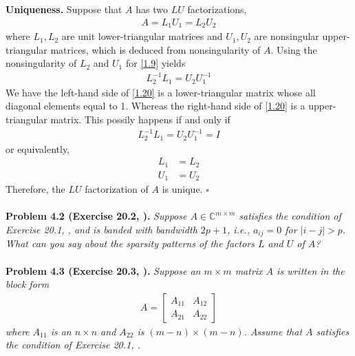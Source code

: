 \documentclass[a4paper,oneside]{book}
\numberwithin{equation}{chapter}
\begin{document}
\textbf{Uniqueness.} Suppose that $A$ has two $LU$ factorizations, 
\begin{align}
\label{1.19}
A = {L_1}{U_1} = {L_2}{U_2}
\end{align}
where $L_1,L_2$ are unit lower-triangular matrices and $U_1, U_2$ are nonsingular upper-triangular matrices, which is deduced from nonsingularity of $A$. Using the nonsingularity of $L_2$ and $U_1$ for \eqref{1.9} yields
\begin{align}
\label{1.20}
L_2^{ - 1}{L_1} = {U_2}U_1^{ - 1}
\end{align}
We have the left-hand side of \eqref{1.20} is a lower-triangular matrix whose all diagonal elements equal to 1. Whereas the right-hand side of \eqref{1.20} is a upper-triangular matrix. This possily happens if and only if
\begin{align}
L_2^{ - 1}{L_1} = {U_2}U_1^{ - 1} = I
\end{align}
or equivalently,
\begin{align}
{L_1}& = {L_2}\\
{U_1} &= {U_2}
\end{align}
Therefore, the $LU$ factorization of $A$ is unique. \hfill $\square$\\
\\
\textbf{Problem 4.2 (Exercise 20.2, \cite{1}).} \textit{Suppose $A\in \mathbb{C}^{m\times m}$ satisfies the condition of Exercise 20.1, \cite{1}, and is banded with bandwidth $2p+1$, i.e., $a_{ij}=0$ for $\left|i-j\right|>p$. What can you say about the sparsity patterns of the factors $L$ and $U$ of $A$?}\\
\\
\textbf{Problem 4.3 (Exercise 20.3, \cite{1}).} \textit{Suppose an $m\times m$ matrix $A$ is written in the block form}
\begin{align}
A = \left[ {\begin{array}{*{20}{c}}
{{A_{11}}}&{{A_{12}}}\\
{{A_{21}}}&{{A_{22}}}
\end{array}} \right]
\end{align}
\textit{where $A_{11}$ is an $n\times n$ and $A_{22}$ is $\left(m-n\right)\times \left(m-n\right)$. Assume that $A$ satisfies the condition of Exercise 20.1, \cite{1}.}
\end{document}
